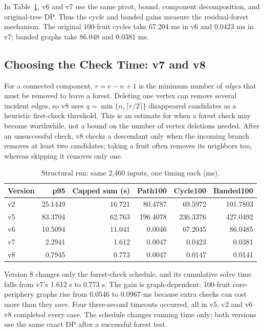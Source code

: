 \documentclass[12pt,a4paper]{report}
\begin{document}
In Table~\ref{tab:forest-perf}, v6 and v7 use the same pivot, bound, component
decomposition, and original-tree DP.  Thus the cycle and banded gains measure
the residual-forest mechanism.  The original 100-fruit cycles take 67.204 ms
in v6 and 0.0423 ms in v7; banded graphs take 86.048 and 0.0381 ms.

\subsection{Choosing the Check Time: v7 and v8}

For a connected component, $r=e-n+1$ is the minimum number of \emph{edges}
that must be removed to leave a forest.  Deleting one vertex can remove
several incident edges, so v8 uses $q=\min\{n,\lceil r/2\rceil\}$ disappeared
candidates as a heuristic first-check threshold.  This is an estimate for
when a forest check may become worthwhile, not a bound on the number of vertex
deletions needed.  After an unsuccessful check, v8 checks a descendant only
when the incoming branch removes at least two candidates; taking a fruit often
removes its neighbors too, whereas skipping it removes only one.

\begin{table}[H]\centering\small
\caption{Structural run: same 2,460 inputs, one timing each (ms).}
\label{tab:forest-perf}
\begin{tabular}{@{}lrrrrr@{}}\toprule
Version & p95 & Capped sum (s) & Path100 & Cycle100 & Banded100\\\midrule
v2 & 25.1449 & 16.721 & 80.4787 & 69.5972 & 101.7803\\
v5 & 83.3704 & 62.763 & 196.4078 & 236.3376 & 427.0492\\
v6 & 10.5094 & 11.041 & 0.0046 & 67.2045 & 86.0485\\
v7 & 2.2941 & 1.612 & 0.0047 & 0.0423 & 0.0381\\
v8 & 0.7945 & 0.773 & 0.0047 & 0.0147 & 0.0141\\
\bottomrule\end{tabular}
\end{table}

Version 8 changes only the forest-check schedule, and its cumulative solve
time falls from v7's 1.612 s to 0.773 s.  The gain is graph-dependent:
100-fruit core-periphery graphs rise from 0.0546 to 0.0967 ms because extra
checks can cost more than they save.  Four three-second timeouts occurred,
all in v5; v2 and v6--v8 completed every case.  The schedule changes running
time only; both versions use the same exact DP after a successful forest test.
\end{document}
